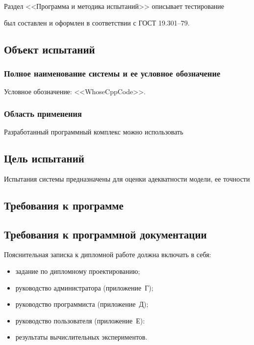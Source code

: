 Раздел <<Программа и методика испытаний>> описывает тестирование

был составлен и оформлен в соответствии с ГОСТ 19.301--79.~\cite{gost_19301} 

\subsection{Объект испытаний}
\subsubsection{Полное наименование системы и ее условное обозначение}

Условное обозначение: <<WhoseCppCode>>.

\subsubsection{Область применения}

Разработанный программный комплекс можно использовать


\subsection{Цель испытаний}

Испытания системы предназначены для оценки адекватности модели, ее точности

\subsection{Требования к программе}

\subsection{Требования к программной документации}

Пояснительная записка к дипломной работе должна включать в себя:

\begin{itemize}
 \item задание по дипломному проектированию;
 \item руководство администратора (приложение~Г);
 \item руководство программиста (приложение~Д);
 \item руководство пользователя (приложение~Е):
 \item результаты вычислительных экспериментов.
\end{itemize}


